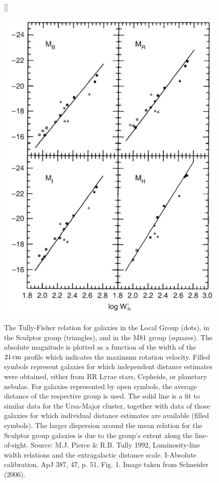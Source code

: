 \documentclass[a4paper,11pt]{article}
\begin{document}
\begin{figure}[h]
[\FBwidth]
{\caption{\footnotesize{The Tully-Fisher relation for galaxies in the Local Group (dots), in the Sculptor group (triangles), and in the M81 group (squares). The absolute magnitude is plotted as a function of the width of the $21\,{\rm cm}$ profile which indicates the maximum rotation velocity. Filled symbols represent galaxies for which independent distance estimates were obtained, either from RR Lyrae stars, Cepheids, or planetary nebulae. For galaxies represented by open symbols, the average distance of the respective group is used. The solid line is a fit to similar data for the Ursa-Major cluster, together with data of those galaxies for which individual distance estimates are available (filled symbols). The larger dispersion around the mean relation for the Sculptor group galaxies is due to the group’s extent along the line-of-sight. Source: M.J. Pierce \& R.B. Tully 1992, Luminosity-line width relations and the extragalactic distance scale. I-Absolute calibration, ApJ 387, 47, p. 51, Fig. 1. Image taken from Schneider (2006).}}
\label{fig:tullyfisher}}
{\includegraphics[width=12cm]{figures/TullyFisher.png}}
\end{figure}
\end{document}
